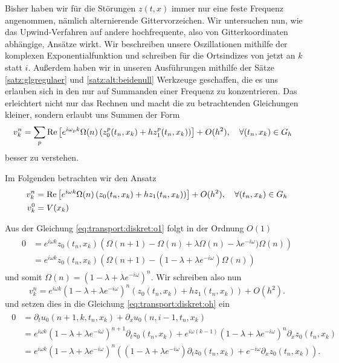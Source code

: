 
Bisher haben wir für die Störungen $z(t,x)$ immer nur eine feste Frequenz angenommen, nämlich alternierende Gittervorzeichen.
Wir untersuchen nun, wie das Upwind-Verfahren auf andere hochfrequente, also von Gitterkoordinaten abhängige, Ansätze wirkt.
Wir beschreiben unsere Oszillationen mithilfe der komplexen Exponentialfunktion und schreiben für die Ortsindizes von jetzt an $k$ statt $i$.
Außerdem haben wir in unseren Ausführungen mithilfe der Sätze \ref{satz:glgregulaer} und \ref{satz:alt:beidenull} Werkzeuge geschaffen, die es uns erlauben sich in den nur auf Summanden einer Frequenz zu konzentrieren.
Das erleichtert nicht nur das Rechnen und macht die zu betrachtenden Gleichungen kleiner, sondern erlaubt uns Summen der Form
\begin{align}
v^n_k &= \sum_{p} \operatorname{Re} \left[ e^{i \omega_p k} \Omega(n) \left( z^p_0(t_n, x_k) + h z^p_1(t_n, x_k) \right) \right] + O(h^2), \quad \forall (t_n,x_k) \in G_h
\end{align}
besser zu verstehen.

Im Folgenden betrachten wir den Ansatz
\begin{align}\label{exp:ansatz}
\begin{split}
v^n_k &= \operatorname{Re} \left[ e^{i \omega k} \Omega(n) \left( z_0(t_n, x_k) + h z_1(t_n, x_k) \right) \right] + O(h^2), \quad \forall (t_n,x_k) \in G_h\\
v^0_k &= V(x_k)
\end{split}
\end{align}

Aus der Gleichung \eqref{eq:transport:diskret:o1} folgt in der Ordnung $O(1)$
\begin{align} 
\begin{split}
0 &= e^{i \omega k} z_0(t_n, x_k) \left( \Omega(n+1) - \Omega(n) + \lambda \Omega(n) - \lambda e^{-i \omega}) \Omega(n) \right)\\
&= e^{i \omega k} z_0(t_n, x_k) \left(\Omega(n+1) - (1 - \lambda + \lambda e^{-i \omega}) \Omega(n) \right)
\end{split}
\end{align}
und somit $\Omega(n) = (1 - \lambda + \lambda e^{-i \omega})^n$. Wir schreiben also nun 
\[  v^n_k = e^{i \omega k} (1 - \lambda + \lambda e^{-i \omega})^n \left( z_0(t_n, x_k) + h z_1(t_n, x_k) \right) + O(h^2). \]
und setzen dies in die Gleichung \eqref{eq:transport:diskret:oh} ein
\begin{align}
\begin{split}
0 &= \partial_t u_0(n+1, k, t_n, x_k) + \partial_x u_0(n, i-1, t_n, x_k)\\
&= e^{i \omega k} (1 - \lambda + \lambda e^{-i \omega})^{n+1} \partial_t z_0(t_n, x_k) + e^{i \omega (k-1)} (1 - \lambda + \lambda e^{-i \omega})^n \partial_x z_0(t_n, x_k)\\
&= e^{i \omega k} (1 - \lambda + \lambda e^{-i \omega})^{n} \left( (1 - \lambda + \lambda e^{-i \omega}) \partial_t z_0(t_n, x_k) + e^{- i \omega} \partial_x z_0(t_n, x_k) \right).
\end{split}
\end{align}

